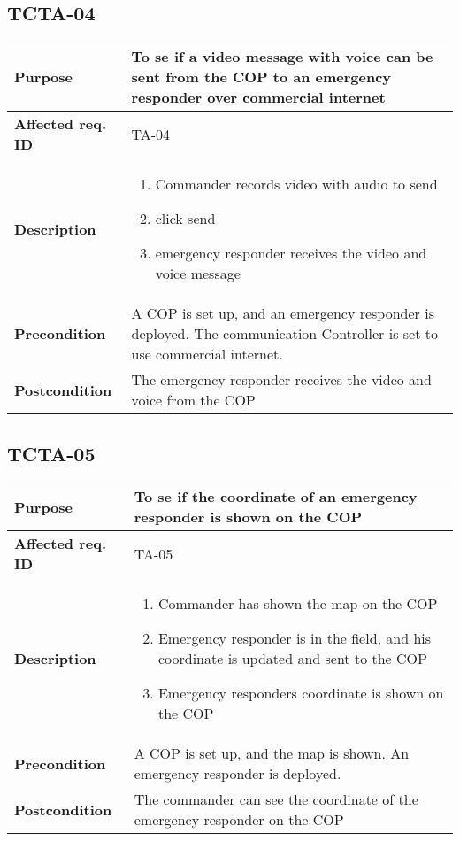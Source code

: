 \subsection{TCTA-04}
\begin{tabular}{ l | m{11cm}}
	\textbf{Purpose}			& To se if a video message with voice can be sent from the COP to an emergency responder over commercial internet\\ \hline
	\textbf{Affected req. ID}	& TA-04 \\ \hline
	\textbf{Description}		& \begin{enumerate}
		\item Commander records video with audio to send \item click send \item emergency responder receives the video and voice message
	\end{enumerate}\\
	\hline
	\textbf{Precondition}		& A COP is set up, and an emergency responder is deployed. The communication Controller is set to use commercial internet.\\ \hline
	\textbf{Postcondition}		& The emergency responder receives the video and voice from the COP\\
\end{tabular}

\subsection{TCTA-05}
\begin{tabular}{ l | m{11cm}}
	\textbf{Purpose}			& To se if the coordinate of an emergency responder is shown on the COP\\ \hline
	\textbf{Affected req. ID}	& TA-05 \\ \hline
	\textbf{Description}		& \begin{enumerate}
		\item Commander has shown the map on the COP \item Emergency responder is in the field, and his coordinate is updated and sent to the COP \item Emergency responders coordinate is shown on the COP
	\end{enumerate}\\
	\hline
	\textbf{Precondition}		& A COP is set up, and the map is shown. An emergency responder is deployed.\\ \hline
	\textbf{Postcondition}		& The commander can see the coordinate of the emergency responder on the COP\\
\end{tabular}

